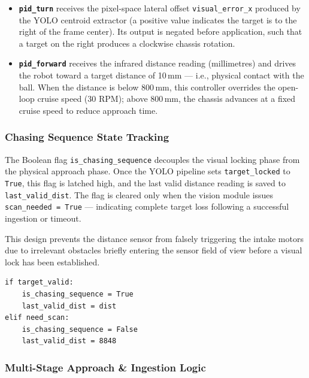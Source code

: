 \begin{itemize}
  \item \textbf{\texttt{pid\_turn}} receives the pixel-space lateral offset
        \texttt{visual\_error\_x} produced by the YOLO centroid extractor (a positive value indicates the target is to the right of the frame center). Its output is negated before application,
        such that a target on the right produces a clockwise chassis rotation.

  \item \textbf{\texttt{pid\_forward}} receives the infrared distance reading (millimetres) and drives the robot toward
        a target distance of 10\,mm — i.e., physical contact with the ball. When the distance is below 800\,mm, this controller
        overrides the open-loop cruise speed (30 RPM); above 800\,mm, the chassis advances at a fixed cruise speed
        to reduce approach time.
\end{itemize}

\subsubsection{Chasing Sequence State Tracking}

The Boolean flag \texttt{is\_chasing\_sequence} decouples the visual locking phase from the physical approach phase.
Once the YOLO pipeline sets \texttt{target\_locked} to \texttt{True}, this flag is latched high,
and the last valid distance reading is saved to \texttt{last\_valid\_dist}.
The flag is cleared only when the vision module issues \texttt{scan\_needed = True} —
indicating complete target loss following a successful ingestion or timeout.

This design prevents the distance sensor from falsely triggering the intake motors due to
irrelevant obstacles briefly entering the sensor field of view before a visual lock has been established.

\begin{verbatim}
if target_valid:
    is_chasing_sequence = True
    last_valid_dist = dist
elif need_scan:
    is_chasing_sequence = False
    last_valid_dist = 8848
\end{verbatim}

\subsubsection{Multi-Stage Approach \& Ingestion Logic}

